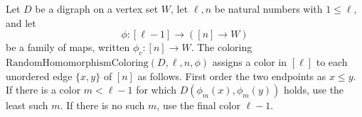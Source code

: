 \begin{definition}
Let \(D\) be a digraph on a vertex set \(W\), let \(\ell,n\) be natural
numbers with \(1\le \ell\), and let
\[
  \phi : [\ell-1]\to([n]\to W)
\]
be a family of maps, written \(\phi_c:[n]\to W\).
The coloring \(\mathrm{RandomHomomorphismColoring}(D,\ell,n,\phi)\) assigns a
color in \([\ell]\) to each unordered edge \(\{x,y\}\) of \([n]\) as follows.
First order the two endpoints as \(x\le y\).  If there is a color
\(m<\ell-1\) for which \(D(\phi_m(x),\phi_m(y))\) holds, use the least such
\(m\).  If there is no such \(m\), use the final color \(\ell-1\).
\end{definition}
